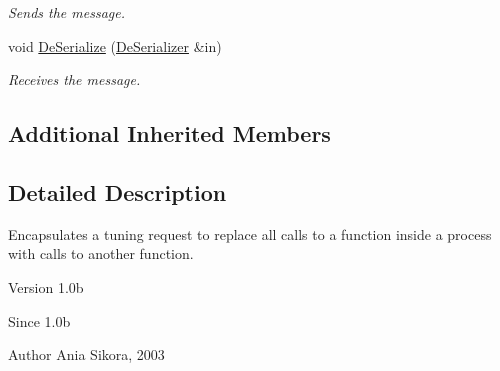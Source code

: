 \begin{DoxyCompactItemize}
\begin{DoxyCompactList}\small\item\em Sends the message. \end{DoxyCompactList}\item 
\hypertarget{class_common_1_1_replace_function_request_ad000a60b1e0bc5c06ec40fd15e8f7080}{void \hyperlink{class_common_1_1_replace_function_request_ad000a60b1e0bc5c06ec40fd15e8f7080}{De\-Serialize} (\hyperlink{class_common_1_1_de_serializer}{De\-Serializer} \&in)}\label{class_common_1_1_replace_function_request_ad000a60b1e0bc5c06ec40fd15e8f7080}

\begin{DoxyCompactList}\small\item\em Receives the message. \end{DoxyCompactList}\end{DoxyCompactItemize}
\subsection*{Additional Inherited Members}


\subsection{Detailed Description}
Encapsulates a tuning request to replace all calls to a function inside a process with calls to another function. 

\begin{DoxyVersion}{Version}
1.\-0b 
\end{DoxyVersion}
\begin{DoxySince}{Since}
1.\-0b 
\end{DoxySince}
\begin{DoxyAuthor}{Author}
Ania Sikora, 2003 
\end{DoxyAuthor}


